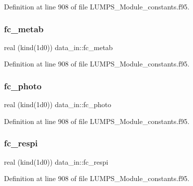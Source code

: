 Definition at line 908 of file L\+U\+M\+P\+S\+\_\+\+Module\+\_\+constants.\+f95.

\mbox{\label{namespacedata__in_a8676790950975f07daf8d24b503ef952}} 
\subsubsection{\texorpdfstring{fc\+\_\+metab}{fc\_metab}}
{\footnotesize\ttfamily real (kind(1d0)) data\+\_\+in\+::fc\+\_\+metab}



Definition at line 908 of file L\+U\+M\+P\+S\+\_\+\+Module\+\_\+constants.\+f95.

\mbox{\label{namespacedata__in_a39642f3fc927b3a4394dda8fef2c193b}} 
\subsubsection{\texorpdfstring{fc\+\_\+photo}{fc\_photo}}
{\footnotesize\ttfamily real (kind(1d0)) data\+\_\+in\+::fc\+\_\+photo}



Definition at line 908 of file L\+U\+M\+P\+S\+\_\+\+Module\+\_\+constants.\+f95.

\mbox{\label{namespacedata__in_a5d6aae5bf11940a5ff7437dfec30cd4f}} 
\subsubsection{\texorpdfstring{fc\+\_\+respi}{fc\_respi}}
{\footnotesize\ttfamily real (kind(1d0)) data\+\_\+in\+::fc\+\_\+respi}



Definition at line 908 of file L\+U\+M\+P\+S\+\_\+\+Module\+\_\+constants.\+f95.

\mbox{\label{namespacedata__in_a9fcca4951f8282ad10df290f8a025387}} 
